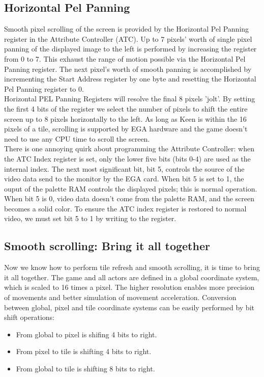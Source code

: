 \documentclass[book.tex]{subfiles}
\begin{document}
\subsection{Horizontal Pel Panning}
Smooth pixel scrolling of the screen is provided by the Horizontal Pel Panning register in the Attribute Controller (ATC). Up to 7 pixels' worth of single pixel panning of the displayed image to the left is performed by increasing the register from 0 to 7. This exhaust the range of motion possible via the Horizontal Pel Panning register. The next pixel's worth of smooth panning is accomplished by incrementing the Start Address register by one byte and resetting the Horizontal Pel Panning register to 0. \\

Horizontal PEL Panning Registers will resolve the final 8 pixels 'jolt'. By setting the first 4 bits of the register we select the number of pixels to shift the entire screen up to 8 pixels horizontally to the left. As long as Keen is within the 16 pixels of a tile, scrolling is supported by EGA hardware and the game doesn't need to use any CPU time to scroll the screen.\\

There is one annoying quirk about programming the Attribute Controller: when the ATC Index register is set, only the lower five bits (bits 0-4) are used as the internal index. The next most significant bit, bit 5, controls the source of the video data send to the monitor by the EGA card. When bit 5 is set to 1, the ouput of the palette RAM controls the displayed pixels; this is normal operation. When bit 5 is 0, video data doesn't come from the palette RAM, and the screen becomes a solid color. To ensure the ATC index register is restored to normal video, we must set bit 5 to 1 by writing  to the register.\\ 

\begin{minipage}{\textwidth}
  
  \end{minipage}
  \label{ega_pel_pan}
  \par

\subsection{Smooth scrolling: Bring it all together}
Now we know how to perform tile refresh and smooth scrolling, it is time to bring it all together. The game and all actors are defined in a global coordinate system, which is scaled to 16 times a pixel. The higher resolution enables more precision of movements and better simulation of movement acceleration. Conversion between global, pixel and tile coordinate systems can be easily performed by bit shift operations:
\begin{itemize}
\item From global to pixel is shifing 4 bits to right.
\item From pixel to tile is shifting 4 bits to right.
\item From global to tile is shifting 8 bits to right.
\end{itemize}
\end{document}
